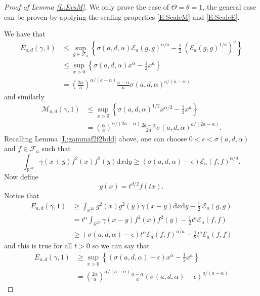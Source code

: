 \documentclass[a4paper,11pt]{article}
\numberwithin{equation}{section}
\numberwithin{equation}{section}
\theoremstyle{plain}
\theoremstyle{definition}
\newcommand{\ud}{\ensuremath{\mathrm{d} }}
\newcommand{\R}{\mathbb{R}}
\begin{document}
\begin{proof}[Proof of Lemma \ref{L:EvsM}]
  We only prove the case of $\Theta=\theta=1$, the general case can be proven by applying the scaling properties \eqref{E:ScaleM} and \eqref{E:ScaleE}.

  We have that
  \begin{align}
    E_{a,d}(\gamma,1)
    & \le \sup_{g\in \mathcal{F}_a} \left\{ \sigma(a,d,\alpha) \mathcal{E}_a(g,g)^{\alpha/a} - \frac{1}{2}\: (\mathcal{E}_a(g,g)^{1/a})^a \right\} \nonumber \\
    & \le \sup_{x>0} \left\{ \sigma(a,d,\alpha) x^\alpha - \frac{1}{2}x^a \right\} \nonumber                                                                 \\
    & = \left(\frac{2\alpha}{a}\right)^{\alpha/(a-\alpha)}\frac{a-\alpha}{a}\sigma(a,d,\alpha)^{a/(a-\alpha)}
    \label{E:Eupperbound}
  \end{align}
  and similarly
  \begin{align}
    \mathcal{M}_{a,d}(\gamma,1)
    & \le \sup_{x > 0} \left\{ \sigma(a,d,\alpha)^{1/2} x^{\alpha/2} - \frac{1}{2} x^{a} \right\} \nonumber \\
    & = \left( \frac{\alpha}{a}\right)^{\alpha/(2a-\alpha)} \frac{2a-\alpha}{2a}\sigma(a,d,\alpha)^{a/(2a-\alpha)}.
    \label{E:Mupperbound}
  \end{align}
  Recalling Lemma \ref{L:gammaf2f2bdd} above, one can choose $0 < \epsilon < \sigma(a,d,\alpha)$ and $f\in
  \mathcal{F}_a$ such that
  \[
    \int_{\R^{2d}} \gamma(x+y)f^2(x)f^2(y) \ud x \ud y \ge (\sigma(a,d,\alpha)-\epsilon) \mathcal{E}_a(f,f)^{\alpha/a}.
  \]
  Now define
  \[
    g(x) = t^{d/2}f(tx).
  \]
  Notice that
  \begin{align*}
    E_{a,d}(\gamma,1)
    & \ge \int_{\R^{2d}} g^2(x)g^2(y) \gamma(x-y)\ud x\ud y - \frac{1}{2}\: \mathcal{E}_a(g,g)    \\
    & = t^\alpha \int_{\R^{2d}} \gamma(x-y) f^2(x)f^2(y) -     \frac{1}{2} t^a \mathcal{E}_a(f,f) \\
    & \ge (\sigma(a,d,\alpha)-\epsilon) t^{\alpha} \mathcal{E}_a(f,f)^{\alpha/a} - \frac{1}{2} t^a \mathcal{E}_a(f,f)
  \end{align*}
  and this is true for all $t>0$ so we can say that
  \begin{align*}
    E_{a,d}(\gamma,1)
    & \ge \sup_{x>0} \left\{ (\sigma(a,d,\alpha)-\epsilon) x^\alpha - \frac{1}{2} x^a \right\} \nonumber \\
    & = \left(\frac{2\alpha}{a}\right)^{\alpha/(a-\alpha)}\frac{a-\alpha}{a}(\sigma(a,d,\alpha)-\epsilon)^{a/(a-\alpha)}

\end{align*}
\end{proof}
\end{document}
